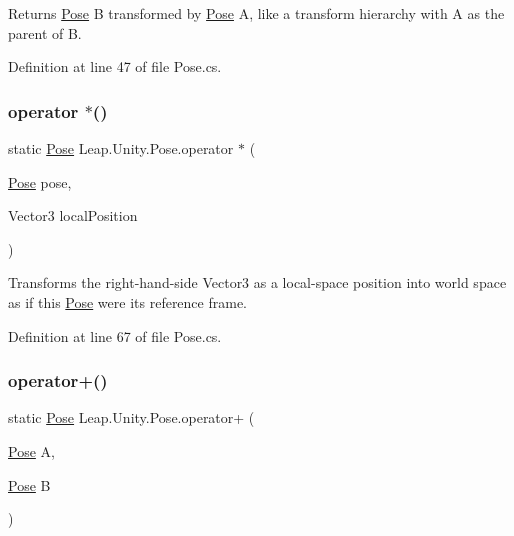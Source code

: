 Returns \mbox{\hyperlink{struct_leap_1_1_unity_1_1_pose}{Pose}} B transformed by \mbox{\hyperlink{struct_leap_1_1_unity_1_1_pose}{Pose}} A, like a transform hierarchy with A as the parent of B. 



Definition at line 47 of file Pose.\+cs.

\mbox{\label{struct_leap_1_1_unity_1_1_pose_a1f7c15fc1732e76b76068aa316f58dbd}} 
\subsubsection{\texorpdfstring{operator $\ast$()}{operator *()}\hspace{0.1cm}{\footnotesize\ttfamily [2/2]}}
{\footnotesize\ttfamily static \mbox{\hyperlink{struct_leap_1_1_unity_1_1_pose}{Pose}} Leap.\+Unity.\+Pose.\+operator $\ast$ (\begin{DoxyParamCaption}\item[{\mbox{\hyperlink{struct_leap_1_1_unity_1_1_pose}{Pose}}}]{pose,  }\item[{Vector3}]{local\+Position }\end{DoxyParamCaption})\hspace{0.3cm}{\ttfamily [static]}}



Transforms the right-\/hand-\/side Vector3 as a local-\/space position into world space as if this \mbox{\hyperlink{struct_leap_1_1_unity_1_1_pose}{Pose}} were its reference frame. 



Definition at line 67 of file Pose.\+cs.

\mbox{\label{struct_leap_1_1_unity_1_1_pose_a26dee98a2b5f124aad5f1c56c21a5e1b}} 
\subsubsection{\texorpdfstring{operator+()}{operator+()}}
{\footnotesize\ttfamily static \mbox{\hyperlink{struct_leap_1_1_unity_1_1_pose}{Pose}} Leap.\+Unity.\+Pose.\+operator+ (\begin{DoxyParamCaption}\item[{\mbox{\hyperlink{struct_leap_1_1_unity_1_1_pose}{Pose}}}]{A,  }\item[{\mbox{\hyperlink{struct_leap_1_1_unity_1_1_pose}{Pose}}}]{B }\end{DoxyParamCaption})\hspace{0.3cm}{\ttfamily [static]}}



